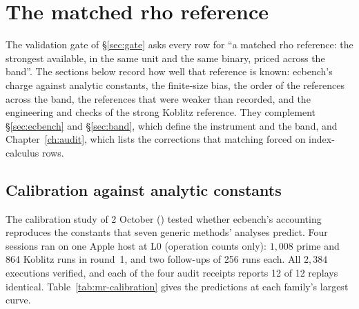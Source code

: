 \chapter{The matched rho reference}\label{ch:matchedrho}

The validation gate of \S\ref{sec:gate} asks every row for ``a matched rho
reference: the strongest available, in the same unit and the same binary,
priced across the band''. The sections below record how well that
reference is known: ecbench's charge against analytic constants, the
finite-size bias, the order of the references across the band, the
references that were weaker than recorded, and the engineering and checks
of the strong Koblitz reference. They complement \S\ref{sec:ecbench} and \S\ref{sec:band}, which define the
instrument and the band, and Chapter~\ref{ch:audit}, which lists the
corrections that matching forced on index-calculus rows.

\section{Calibration against analytic constants}\label{sec:mr-calibration}

The calibration study of 2 October
() tested whether ecbench's
accounting reproduces the constants that seven generic methods' analyses
predict. Four sessions ran on one Apple host at L0 (operation counts only):
$1{,}008$ prime and $864$ Koblitz runs in round~1, and two follow-ups of
256 runs each. All $2{,}384$ executions verified, and each of the four audit
receipts reports 12 of 12 replays identical. Table~\ref{tab:mr-calibration}
gives the predictions at each family's largest curve.

